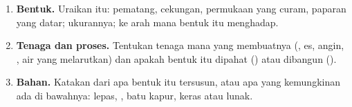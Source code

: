 \begin{method}
\begin{enumerate}
  \item \textbf{Bentuk.} Uraikan  itu: pematang, cekungan,
        permukaan yang curam, paparan yang datar; ukurannya; ke arah mana
        bentuk itu menghadap.
  \item \textbf{Tenaga dan proses.} Tentukan tenaga mana yang membuatnya
        (, es, angin, , air yang melarutkan) dan apakah bentuk itu
        dipahat () atau dibangun ().
  \item \textbf{Bahan.} Katakan dari apa bentuk itu tersusun, atau 
        apa yang kemungkinan ada di bawahnya:  lepas, , batu
        kapur,  keras atau lunak.
\end{enumerate}
\end{method}

